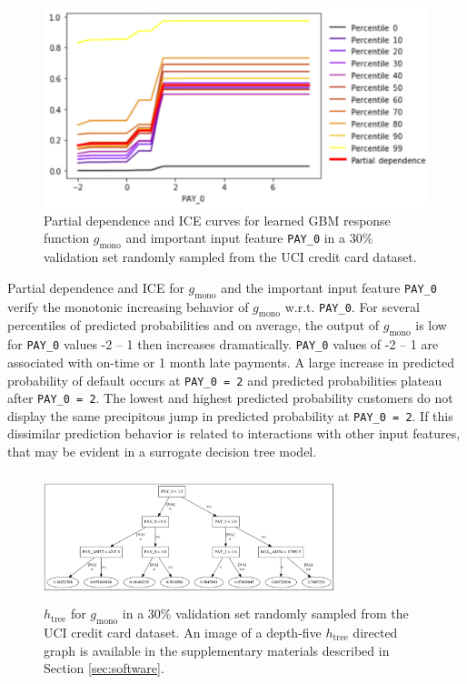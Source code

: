 \documentclass[sigconf, review]{acmart}
\begin{document}
\begin{figure}[htb]
	\begin{center}
		\includegraphics[scale=0.45]{img/figure_8-eps-converted-to.pdf}
		\caption{Partial dependence and ICE curves for learned GBM response function $g_{\text{mono}}$ and important input feature \texttt{PAY\_0} in a 30\% validation set randomly sampled from the UCI credit card dataset.}
		\label{fig:cc_pdp_ice}
	\end{center}
\end{figure}

Partial dependence and ICE for $g_{\text{mono}}$ and the important input feature \texttt{PAY\_0} verify the monotonic increasing behavior of $g_{\text{mono}}$ w.r.t. \texttt{PAY\_0}. For several percentiles of predicted probabilities and on average, the output of $g_{\text{mono}}$ is low for \texttt{PAY\_0} values -2 -- 1 then increases dramatically. \texttt{PAY\_0} values of -2 -- 1 are associated with on-time or 1 month late payments. A large increase in predicted probability of default occurs at \texttt{PAY\_0 = 2} and predicted probabilities plateau after \texttt{PAY\_0 = 2}. The lowest and highest predicted probability customers do not display the same precipitous jump in predicted probability at \texttt{PAY\_0 = 2}. If this dissimilar prediction behavior is related to interactions with other input features, that may be evident in a surrogate decision tree model.

\begin{figure}[htb]
	\begin{center}
		\includegraphics[height=105pt, width=240pt]{img/figure_9.eps}
		\caption{$h_{\text{tree}}$ for $g_{\text{mono}}$ in a 30\% validation set randomly sampled from the UCI credit card dataset. An image of a depth-five $h_{\text{tree}}$ directed graph is available in the supplementary materials described in Section \ref{sec:software}.}
		\label{fig:cc_dt_surrogate}
	\end{center}
\end{figure}
\end{document}
